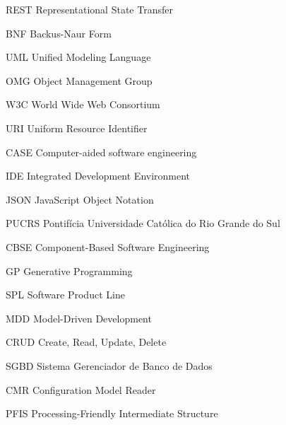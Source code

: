 \documentclass[
	12pt,				%
	openright,			%
	oneside,			%
	a4paper,			%
	english,			%
	french,				%
	spanish,			%
	brazil,				%
	]{abntex2}
\begin{document}

\frenchspacing 


\imprimircapa

\imprimirfolhaderosto


\listoffigures*
\cleardoublepage

\listoftables*
\cleardoublepage

\begin{siglas}
  \item[REST] Representational State Transfer
  \item[BNF] Backus-Naur Form
  \item[UML] Unified Modeling Language
  \item[OMG] Object Management Group
  \item[W3C] World Wide Web Consortium
  \item[URI] Uniform Resource Identifier
  \item[CASE] Computer-aided software engineering
  \item[IDE] Integrated Development Environment
  \item[JSON] JavaScript Object Notation
  \item[PUCRS] Pontifícia Universidade Católica do Rio Grande do Sul
  \item[CBSE] Component-Based Software Engineering
  \item[GP] Generative Programming
  \item[SPL] Software Product Line
  \item[MDD] Model-Driven Development
  \item[CRUD] Create, Read, Update, Delete
  \item[SGBD] Sistema Gerenciador de Banco de Dados
  \item[CMR] Configuration Model Reader
  \item[PFIS] Processing-Friendly Intermediate Structure
\end{siglas}
\end{document}
